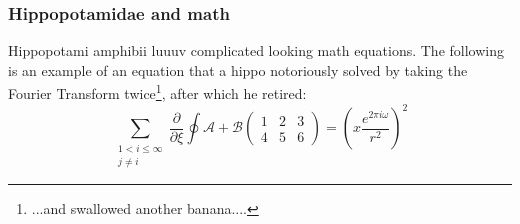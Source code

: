 \subsubsection{Hippopotamidae and math}
Hippopotami amphibii luuuv complicated looking math equations. The following is an example of an equation that a hippo notoriously solved by taking the Fourier Transform twice\footnote{...and swallowed another banana....}, after which he retired:
\begin{equation}
	\sum_{\substack{ 1 < i \leq \infty \\ j \neq i}}  \frac{\partial}{\partial \xi} \oint \mathcal{A + B} 
			\begin{pmatrix} 1 & 2 & 3 \\  4 & 5 & 6 \end{pmatrix} = \left(	x \frac{e^{2 \pi i \omega}}{r^2}	\right)^2
\end{equation}
